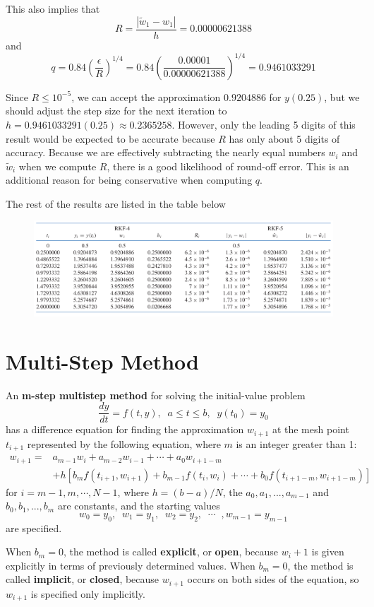 \begin{ex}
\begin{solution}
		This also implies that
		\[R = \frac{|\tilde{w}_1 - w_1|}{h} = 0.00000621388\]
		and
		\[ q = 0.84\left(\frac{\epsilon}{R}\right)^{1/4} =  0.84\left(\frac{0.00001}{0.00000621388}\right)^{1/4} = 0.9461033291 \]
		
		Since $R \leq 10^{-5}$, we can accept the approximation $0.9204886$ for $y(0.25)$, but we should adjust the step size for the next iteration to $h = 0.9461033291(0.25) \approx 0.2365258$. However, only the leading 5 digits of this result would be expected to be accurate because $R$ has only about 5 digits of accuracy. Because we are effectively subtracting the nearly equal numbers $w_i$ and $\tilde{w}_i$ when we compute $R$, there is a good likelihood of round-off error. This is an additional reason for being conservative when computing $q$.
		
		The rest of the results are listed in the table below
		\begin{figure} [H]
			\includegraphics*[width=15cm]{img/chapter8table4.PNG}
		\end{figure}
	\end{solution}
\end{ex}

\section{Multi-Step Method}
\begin{definition}
	An \textbf{m-step multistep method} for solving the initial-value problem
	\[ \frac{dy}{dt} = f(t,y),\;\;a\leq t\leq b,\;\; y(t_0)=y_0 \]
	has a difference equation for finding the approximation $w_{i+1}$ at the mesh point $t_{i+1}$ represented by the following equation, where $m$ is an integer greater than 1:
	\begin{align*}
	w_{i+1} = &a_{m-1}w_i + a_{m-2}w_{i-1} + \cdots + a_{0}w_{i+1-m}\\
	&+ h[b_m f(t_{i+1}, w_{i+1}) + b_{m-1} f(t_i , w_i ) + \cdots + b_0 f(t_{i+1-m}, w_{i+1-m})]
	\end{align*}
	for $i = m-1, m,\cdots , N-1$, where $h = (b-a)/N$, the $a_0, a_1,... , a_{m-1}$ and $b_0, b_1,... , b_m$ are constants, and the starting values
	\[ w_0 = y_0,\;\;w_1 = y_1,\;\; w_2 = y_2,\;\;\cdots\;\;, w_{m-1} = y_{m-1} \]
	are specified.
	
	When $b_m = 0$, the method is called \textbf{explicit}, or \textbf{open}, because
	$w_i+1$ is given explicitly in terms of previously determined values. When $b_m = 0$, the method is called \textbf{implicit}, or \textbf{closed}, because $w_{i+1}$ occurs on both sides of the equation, so $w_{i+1}$ is specified only implicitly.
\end{definition}

